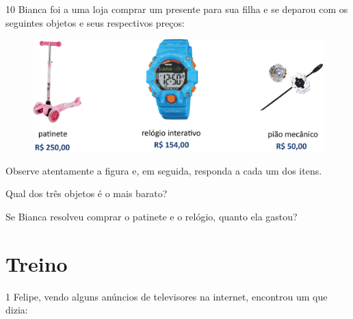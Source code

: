 
\pagebreak
\num{10} Bianca foi a uma loja comprar um presente para sua filha e se deparou
com os seguintes objetos e seus respectivos preços:

\begin{figure}[htpb!]
\centering
\includegraphics[width=\textwidth]{./media/image72.png}
\end{figure}

Observe atentamente a figura e, em seguida, responda a cada um dos itens.

\begin{escolha}
\item Qual dos três objetos é o mais barato?

\item Se Bianca resolveu comprar o patinete e o relógio, quanto ela gastou?
\end{escolha}



\pagebreak
\section*{Treino}

\num{1} Felipe, vendo alguns anúncios de televisores na internet, encontrou um que dizia:

